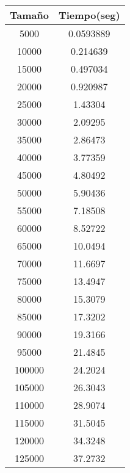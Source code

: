 \begin{tabular}{|c|c|}
\hline
\textbf{Tamaño} & \textbf{Tiempo(seg)} \\ \hline
5000   & 0.0593889   \\ \hline
10000  & 0.214639    \\ \hline
15000  & 0.497034    \\ \hline
20000  & 0.920987    \\ \hline
25000  & 1.43304     \\ \hline
30000  & 2.09295     \\ \hline
35000  & 2.86473     \\ \hline
40000  & 3.77359     \\ \hline
45000  & 4.80492     \\ \hline
50000  & 5.90436     \\ \hline
55000  & 7.18508     \\ \hline
60000  & 8.52722     \\ \hline
65000  & 10.0494     \\ \hline
70000  & 11.6697     \\ \hline
75000  & 13.4947     \\ \hline
80000  & 15.3079     \\ \hline
85000  & 17.3202     \\ \hline
90000  & 19.3166     \\ \hline
95000  & 21.4845     \\ \hline
100000 & 24.2024     \\ \hline
105000 & 26.3043     \\ \hline
110000 & 28.9074     \\ \hline
115000 & 31.5045     \\ \hline
120000 & 34.3248     \\ \hline
125000 & 37.2732     \\ \hline
\end{tabular}
